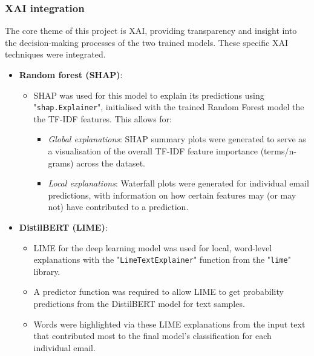 
\subsubsection*{XAI integration}
The core theme of this project is XAI, providing transparency and insight into the decision-making processes of the two trained models. These specific XAI techniques were integrated.

\begin{itemize}
  \item \textbf{Random forest (SHAP)}:
  \begin{itemize}
    \item SHAP was used for this model to explain its predictions using "\texttt{shap.Explainer}", initialised with the trained Random Forest model the the TF-IDF features. This allows for:
    \begin{itemize}
      \item \textit{Global explanations}: SHAP summary plots were generated to serve as a visualisation of the overall TF-IDF feature importance (terms/n-grams) across the dataset.
      \item \textit{Local explanations}: Waterfall plots were generated for individual email predictions, with information on how certain features may (or may not) have contributed to a prediction.
    \end{itemize}
  \end{itemize}
  \item \textbf{DistilBERT (LIME)}:
  \begin{itemize}
    \item LIME for the deep learning model was used for local, word-level explanations with the "\texttt{LimeTextExplainer}" function from the "\texttt{lime}" library.
    \item A predictor function was required to allow LIME to get probability predictions from the DistilBERT model for text samples.
    \item Words were highlighted via these LIME explanations from the input text that contributed most to the final model's classification for each individual email.
  \end{itemize}
\end{itemize}
